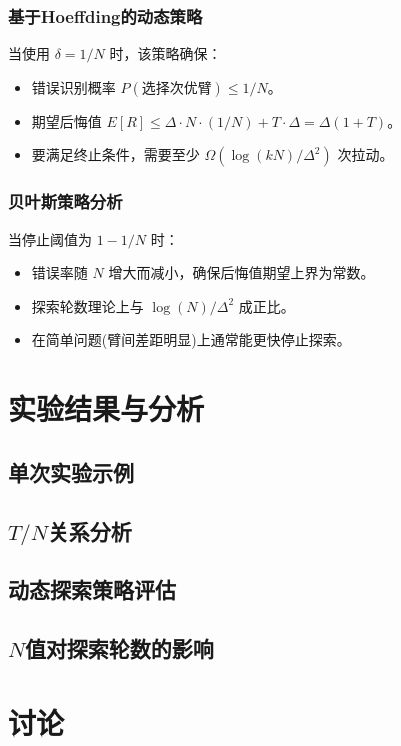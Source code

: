 \documentclass[8pt, a4paper]{ctexart} %
\newcommand{\N}{\ensuremath{N}}
\newcommand{\T}{\ensuremath{T}}
\newcommand{\kArms}{\ensuremath{k}}
\newcommand{\deltaVal}{\ensuremath{\delta}}
\newcommand{\DeltaVal}{\ensuremath{\Delta}}
\begin{document}
\subsubsection{基于Hoeffding的动态策略}
当使用 $\deltaVal = 1/\N$ 时，该策略确保：
\begin{itemize}
    \item 错误识别概率 $P(\text{选择次优臂}) \leq 1/\N$。
    \item 期望后悔值 $E[R] \leq \DeltaVal \cdot \N \cdot (1/\N) + \T \cdot \DeltaVal = \DeltaVal(1+\T)$。
    \item 要满足终止条件，需要至少 $\Omega(\log(\kArms\N)/\DeltaVal^2)$ 次拉动。
\end{itemize}

\subsubsection{贝叶斯策略分析}
当停止阈值为 $1-1/\N$ 时：
\begin{itemize}
    \item 错误率随 $\N$ 增大而减小，确保后悔值期望上界为常数。
    \item 探索轮数理论上与 $\log(\N)/\DeltaVal^2$ 成正比。
    \item 在简单问题(臂间差距明显)上通常能更快停止探索。
\end{itemize}

\section{实验结果与分析}

\subsection{单次实验示例}


\subsection{$\T/\N$关系分析}


\subsection{动态探索策略评估}


\subsection{$\N$值对探索轮数的影响}


\section{讨论}
\end{document}
